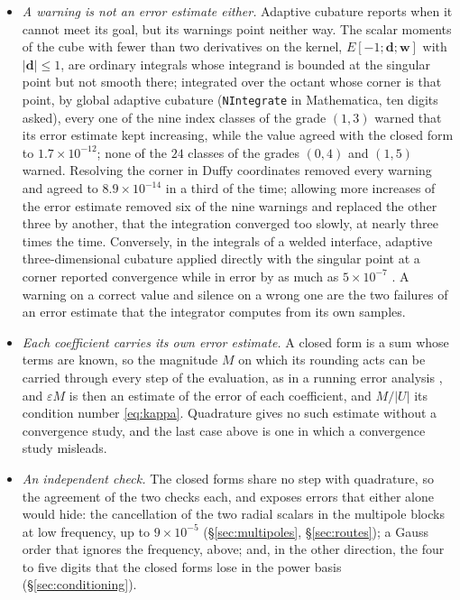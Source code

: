 \documentclass[11pt,a4paper]{article}
\begin{document}
\begin{itemize}
\item \emph{A warning is not an error estimate either.} Adaptive cubature reports when it cannot meet its goal,
but its warnings point neither way. The scalar moments of the cube with fewer than two derivatives on the
kernel, $E[-1;\mathbf d;\mathbf w]$ with $|\mathbf d|\le1$, are ordinary integrals whose integrand is bounded at
the singular point but not smooth there; integrated over the octant whose corner is that point, by global
adaptive cubature (\texttt{NIntegrate} in Mathematica, ten digits asked), every one of the nine index classes
of the grade $(1,3)$ warned that its error estimate kept increasing, while the value agreed with the closed form
to $1.7\times10^{-12}$; none of the $24$ classes of the grades $(0,4)$ and $(1,5)$ warned. Resolving the corner
in Duffy coordinates removed every warning and agreed to $8.9\times10^{-14}$ in a third of the time; allowing
more increases of the error estimate removed six of the nine warnings and replaced the other three by another,
that the integration converged too slowly, at nearly three times the time. Conversely, in the integrals of a
welded interface, adaptive three-dimensional cubature applied directly with the singular point at a corner
reported convergence while in error by as much as $5\times10^{-7}$ \citep{NestorInterface2026}. A warning on a correct value and silence on a wrong one are the two failures of
an error estimate that the integrator computes from its own samples.

\item \emph{Each coefficient carries its own error estimate.} A closed form is a sum whose terms are known,
so the magnitude $M$ on which its rounding acts can be carried through every step of the evaluation, as
in a running error analysis \citep{Higham2002}, and $\varepsilon M$ is then an estimate of the error of each
coefficient, and $M/|U|$ its condition number \eqref{eq:kappa}. Quadrature gives no such estimate without a convergence
study, and the last case above is one in which a convergence study misleads.

\item \emph{An independent check.} The closed forms share no step with quadrature, so the agreement of the
two checks each, and exposes errors that either alone would hide: the cancellation of the two radial
scalars in the multipole blocks at low frequency, up to $9\times10^{-5}$ (\S\ref{sec:multipoles},
\S\ref{sec:routes}); a Gauss order that ignores the frequency, above; and, in the other direction, the four
to five digits that the closed forms lose in the power basis (\S\ref{sec:conditioning}).


\end{itemize}
\end{document}

